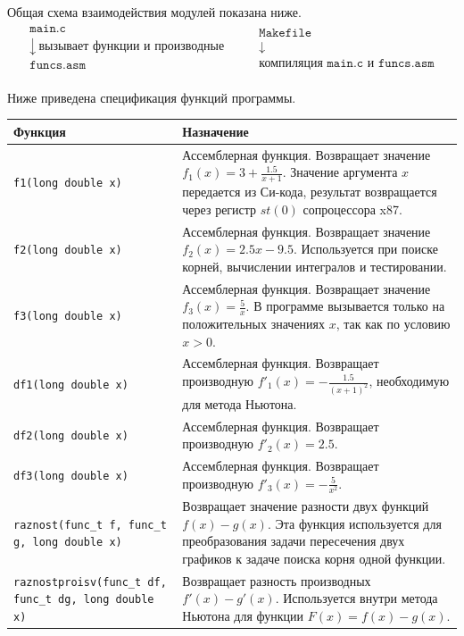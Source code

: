 \documentclass[a4paper,12pt,titlepage,finall]{article}
\begin{document}
Общая схема взаимодействия модулей показана ниже.
\[
\begin{array}{c}
\boxed{\texttt{main.c}}\\[2mm]
\downarrow\ \text{вызывает функции и производные}\\[2mm]
\boxed{\texttt{funcs.asm}}\\[2mm]
\end{array}
\qquad
\begin{array}{c}
\boxed{\texttt{Makefile}}\\[2mm]
\downarrow\\[2mm]
\text{компиляция } \texttt{main.c} \text{ и } \texttt{funcs.asm}
\end{array}
\]

Ниже приведена спецификация функций программы.

\begin{longtable}{|p{}|p{}|}
\hline
Функция & Назначение \\
\hline
\texttt{f1(long double x)} & Ассемблерная функция. Возвращает значение \(f_1(x)=3+\frac{1.5}{x+1}\). Значение аргумента \(x\) передается из Си-кода, результат возвращается через регистр \(st(0)\) сопроцессора x87. \\
\hline
\texttt{f2(long double x)} & Ассемблерная функция. Возвращает значение \(f_2(x)=2.5x-9.5\). Используется при поиске корней, вычислении интегралов и тестировании. \\
\hline
\texttt{f3(long double x)} & Ассемблерная функция. Возвращает значение \(f_3(x)=\frac{5}{x}\). В программе вызывается только на положительных значениях \(x\), так как по условию \(x>0\). \\
\hline
\texttt{df1(long double x)} & Ассемблерная функция. Возвращает производную \(f'_1(x)=-\frac{1.5}{(x+1)^2}\), необходимую для метода Ньютона. \\
\hline
\texttt{df2(long double x)} & Ассемблерная функция. Возвращает производную \(f'_2(x)=2.5\). \\
\hline
\texttt{df3(long double x)} & Ассемблерная функция. Возвращает производную \(f'_3(x)=-\frac{5}{x^2}\). \\
\hline
\texttt{raznost(func\_t f, func\_t g, long double x)} & Возвращает значение разности двух функций \(f(x)-g(x)\). Эта функция используется для преобразования задачи пересечения двух графиков к задаче поиска корня одной функции. \\
\hline
\texttt{raznostproisv(func\_t df, func\_t dg, long double x)} & Возвращает разность производных \(f'(x)-g'(x)\). Используется внутри метода Ньютона для функции \(F(x)=f(x)-g(x)\). \\

\end{longtable}
\end{document}
